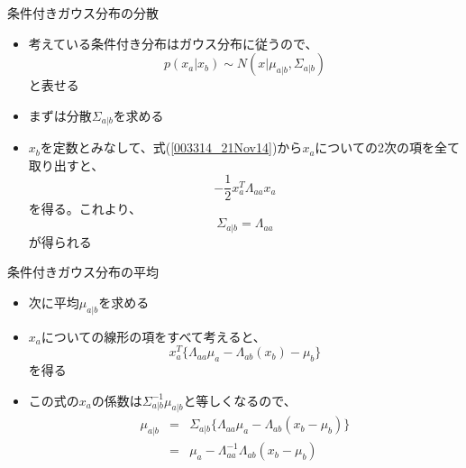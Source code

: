 \begin{frame}{条件付きガウス分布の分散}
 \begin{itemize}
  \item 考えている条件付き分布はガウス分布に従うので、
        \begin{equation}
         p(x_a | x_b) \sim N(x | \mu_{a|b}, \Sigma_{a|b})
        \end{equation}
        と表せる
  \item まずは分散$\Sigma_{a|b}$を求める
  \item $x_b$を定数とみなして、式(\ref{003314_21Nov14})から$x_a$についての2次の項を全て取り出すと、
        \begin{equation}
         -\frac{1}{2}x_a^T\Lambda_{aa}x_a
        \end{equation}
        を得る。これより、
        \begin{equation}
         \Sigma_{a|b} = \Lambda_{aa}
        \end{equation}
        が得られる
 \end{itemize}
\end{frame}

\begin{frame}{条件付きガウス分布の平均}
 \begin{itemize}
  \item 次に平均$\mu_{a|b}$を求める
  \item $x_a$についての線形の項をすべて考えると、
        \begin{equation}
         x_a^T\{ \Lambda_{aa}\mu_a-\Lambda_{ab}(x_b)-\mu_b\}
        \end{equation}
        を得る
  \item この式の$x_a$の係数は$\Sigma^{-1}_{a|b}\mu_{a|b}$と等しくなるので、
        \begin{eqnarray}
         \mu_{a|b} &=& \Sigma_{a|b}\{\Lambda_{aa}\mu_a-\Lambda_{ab}(x_b-\mu_b)\}\\
         &= & \mu_a - \Lambda_{aa}^{-1}\Lambda_{ab}(x_b-\mu_b)
        \end{eqnarray}
 \end{itemize}
\end{frame}

